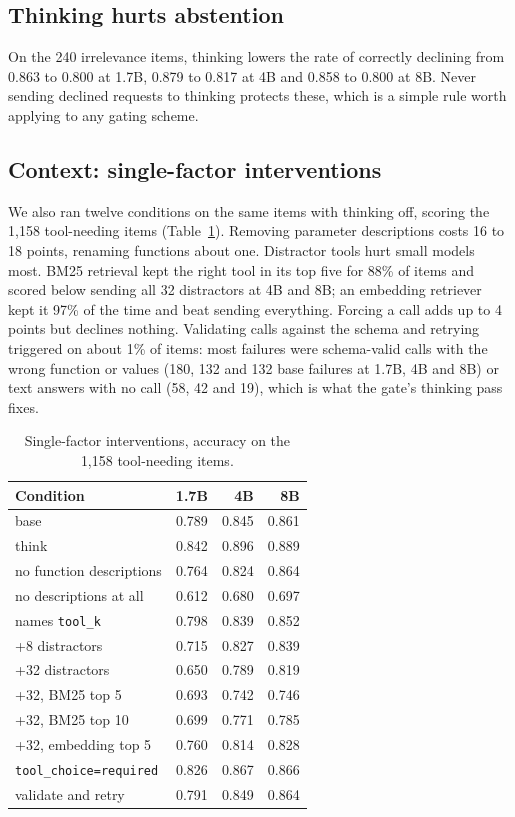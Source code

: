 \documentclass[10pt,twocolumn]{article}
\begin{document}
\subsection{Thinking hurts abstention}

On the 240 irrelevance items, thinking lowers the rate of correctly declining from 0.863 to 0.800 at 1.7B, 0.879 to
0.817 at 4B and 0.858 to 0.800 at 8B. Never sending declined requests to thinking protects these, which is a simple
rule worth applying to any gating scheme.

\subsection{Context: single-factor interventions}

We also ran twelve conditions on the same items with thinking off, scoring the 1,158 tool-needing items
(Table~\ref{tab:abl}). Removing parameter descriptions costs 16 to 18 points, renaming functions about one. Distractor
tools hurt small models most. BM25 retrieval kept the right tool in its top five for 88\% of items and scored below
sending all 32 distractors at 4B and 8B; an embedding retriever kept it 97\% of the time and beat sending everything.
Forcing a call adds up to 4 points but declines nothing. Validating calls against the schema and retrying triggered on
about 1\% of items: most failures were schema-valid calls with the wrong function or values (180, 132 and 132 base
failures at 1.7B, 4B and 8B) or text answers with no call (58, 42 and 19), which is what the gate's thinking pass fixes.

\begin{table}[t]
\centering\small
\begin{tabular}{lrrr}
\toprule
Condition & 1.7B & 4B & 8B \\
\midrule
base & 0.789 & 0.845 & 0.861 \\
think & 0.842 & 0.896 & 0.889 \\
no function descriptions & 0.764 & 0.824 & 0.864 \\
no descriptions at all & 0.612 & 0.680 & 0.697 \\
names \texttt{tool\_k} & 0.798 & 0.839 & 0.852 \\
+8 distractors & 0.715 & 0.827 & 0.839 \\
+32 distractors & 0.650 & 0.789 & 0.819 \\
+32, BM25 top 5 & 0.693 & 0.742 & 0.746 \\
+32, BM25 top 10 & 0.699 & 0.771 & 0.785 \\
+32, embedding top 5 & 0.760 & 0.814 & 0.828 \\
\texttt{tool\_choice=required} & 0.826 & 0.867 & 0.866 \\
validate and retry & 0.791 & 0.849 & 0.864 \\
\bottomrule
\end{tabular}
\caption{Single-factor interventions, accuracy on the 1,158 tool-needing items.}
\label{tab:abl}
\end{table}
\end{document}
